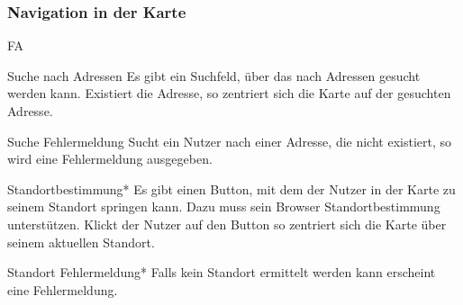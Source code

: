 \subsubsection*{Navigation in der Karte}
\begin{Kriterien}{FA}
  \item[Suche nach Adressen]
    Es gibt ein Suchfeld, über das nach Adressen gesucht werden kann. Existiert die Adresse, so zentriert sich die Karte 
    auf der gesuchten Adresse.

  \item[Suche Fehlermeldung]
    Sucht ein Nutzer nach einer Adresse,  die nicht existiert, so wird eine Fehlermeldung ausgegeben. 

  \item[Standortbestimmung*]
    Es gibt einen Button, mit dem der Nutzer in der Karte zu seinem Standort springen kann. Dazu 
    muss sein Browser Standortbestimmung unterstützen. Klickt der Nutzer auf den Button so zentriert sich die Karte über seinem 
    aktuellen Standort.
  
  \item[Standort Fehlermeldung*]
    Falls kein Standort ermittelt werden kann erscheint eine Fehlermeldung.
\end{Kriterien}

